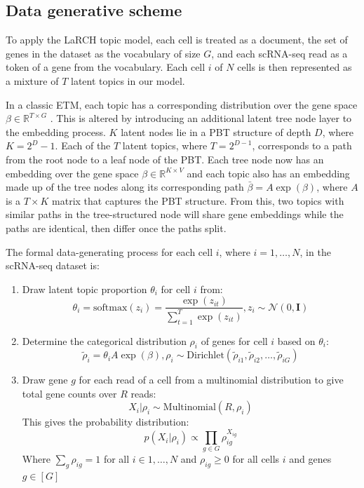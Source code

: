\subsection{Data generative scheme}

To apply the LaRCH topic model, each cell is treated as a document, the set of genes in the dataset as the vocabulary of size $G$, and each scRNA-seq read as a token of a gene from the vocabulary. Each cell $i$ of $N$ cells is then represented as a mixture of $T$ latent topics in our model. 

In a classic ETM, each topic has a corresponding distribution over the gene space $\beta \in \mathbb{R}^{T \times G}$ \cite{etm1}. This is altered by introducing an additional latent tree node layer to the embedding process. $K$ latent nodes lie in a PBT structure of depth $D$, where $K = 2^D - 1$. Each of the $T$ latent topics, where $T = 2^{D-1}$, corresponds to a path from the root node to a leaf node of the PBT. Each tree node now has an embedding over the gene space $\beta \in \mathbb{R}^{K \times V}$ and each topic also has an embedding made up of the tree nodes along its corresponding path $\bar{\beta} =A\exp(\beta)$, where $A$ is a $T \times K$ matrix that captures the PBT structure. From this, two topics with similar paths in the tree-structured node will share gene embeddings while the paths are identical, then differ once the paths split. 

The formal data-generating process for each cell $i$, where $i = 1, \dots, N$, in the scRNA-seq dataset is:
\begin{enumerate}
    \item Draw latent topic proportion $\theta_i$ for cell $i$ from:
    \begin{equation}
        \theta_i = \text{softmax}(z_i) = \frac{\exp(z_{it})}{\sum_{t = 1}^T \exp(z_{it})}, z_i \sim \mathcal{N}(0, \textbf{I})
    \end{equation}
    \item Determine the categorical distribution $\rho_i$ of genes for cell $i$ based on $\theta_i$:
    \begin{equation}
        \tilde{\rho}_i = \theta_iA\exp(\beta), \rho_i \sim \text{Dirichlet}(\tilde{\rho}_{i1}, \tilde{\rho}_{i2}, \dots, \tilde{\rho}_{iG})
    \end{equation}
    \item Draw gene $g$ for each read of a cell from a multinomial distribution to give total gene counts over $R$ reads:
    \begin{equation}
        X_i|\rho_i \sim \text{Multinomial}(R, \rho_i)
    \end{equation}
    This gives the probability distribution: 
    \begin{equation*}
        p(X_i|\rho_i)\propto \prod_{g\in G} \rho_{ig}^{X_{ig}}
    \end{equation*}
    Where $\sum_{g}\rho_{ig} = 1$ for all $i \in 1, \dots, N$ and $\rho_{ig} \geq 0$ for all cells $i$ and genes $g \in [G]$
\end{enumerate}

